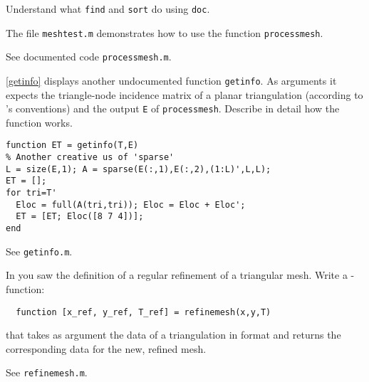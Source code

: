 \begin{problem}
\begin{subproblem}[2]
 \begin{hint}
  Understand what \verb|find| and \verb|sort| do using \matlab{} \texttt{doc}.
 \end{hint}
 
 \begin{hint}
  The \Matlab{} file \verb|meshtest.m| demonstrates how to 
  use the function \verb|processmesh|.
 \end{hint}
 
 \begin{solution}
  See documented code \texttt{processmesh.m}.
 \end{solution}

\end{subproblem}

\begin{subproblem}[3]
\cref{getinfo} displays another undocumented function 
\verb|getinfo|. As arguments it expects the
  triangle-node incidence matrix of a planar triangulation
  (according to \matlab{}'s conventions) and the output
  \texttt{E} of \verb|processmesh|. Describe in detail how the function works.

\begin{lstlisting}[style=mcode,label={getinfo},caption={Another undocumented
    function for extracting specific information from a planar triangulation}]
function ET = getinfo(T,E)
% Another creative us of 'sparse'
L = size(E,1); A = sparse(E(:,1),E(:,2),(1:L)',L,L); 
ET = [];
for tri=T'
  Eloc = full(A(tri,tri)); Eloc = Eloc + Eloc';
  ET = [ET; Eloc([8 7 4])];
end
\end{lstlisting}

 \begin{solution}
  See \texttt{getinfo.m}.
 \end{solution}
\end{subproblem}

\begin{subproblem}[4]
  In  you saw the definition of a regular refinement of a
  triangular mesh. Write a \Matlab-function:
 \begin{verbatim}
  function [x_ref, y_ref, T_ref] = refinemesh(x,y,T)
 \end{verbatim}
  that takes as argument the data of a triangulation in \matlab{} format and
  returns the corresponding data for the new, refined mesh.

 \begin{solution}
  See \texttt{refinemesh.m}.
 \end{solution}
\end{subproblem}


\end{problem}
